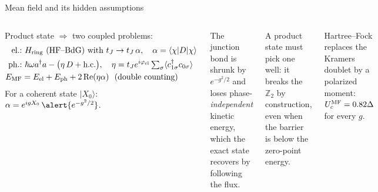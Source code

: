 \documentclass[aspectratio=169,9pt]{beamer}
\newcommand{\hw}{\hbar\omega}
\newcommand{\Hring}{H_{\rm ring}}
\newcommand{\pcl}{\varphi_{\rm cl}}
\begin{document}
\begin{frame}{Mean field and its hidden assumptions}
  \begin{columns}[T]
    \small Product state $\Rightarrow$ two coupled problems:
    \begin{align*}
      \text{el.:}&\ \Hring\ \text{(HF--BdG) with}\ t_J\to t_J\,\alpha,\quad \alpha=\langle\chi|D|\chi\rangle\\
      \text{ph.:}&\ \hw a^\dagger a-\big(\eta\,D+\text{h.c.}\big),\quad
      \eta=t_Je^{i\pcl}\textstyle\sum_\sigma\langle c^\dagger_{1\sigma}c_{0\sigma}\rangle\\
      E_{\rm MF}&=E_{\rm el}+E_{\rm ph}+2\,\mathrm{Re}(\eta\alpha)\ \ \text{(double counting)}
    \end{align*}
    For a coherent state $|X_0\rangle$: \ $\alpha=e^{igX_0}\,\alert{e^{-g^2/2}}$.
    \begin{warnbox}[title={(i) Not gauge covariant}]
      \footnotesize The junction bond is shrunk by $e^{-g^2/2}$ and loses phase-\emph{independent} kinetic energy,
      which the exact state recovers by following the flux.
    \end{warnbox}
    \begin{warnbox}[title={(ii) Self-trapping}]
      \footnotesize A product state must pick one well: it breaks the $\mathbb Z_2$ by construction, even when the
      barrier is below the zero-point energy.
    \end{warnbox}
    \begin{warnbox}[title={(iii) Static moment}]
      \footnotesize Hartree--Fock replaces the Kramers doublet by a polarized moment: $U_c^{\rm MF}=0.82\Delta$ for every $g$.
    \end{warnbox}
  \end{columns}
\end{frame}
\end{document}
